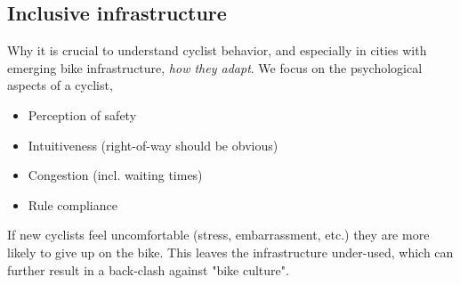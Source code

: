 \color{red}
\subsection{Inclusive infrastructure}
Why it is crucial to understand cyclist behavior, and especially in cities with emerging bike infrastructure, \textit{how they adapt}.
We focus on the psychological aspects of a cyclist,

\begin{itemize}
	\item Perception of safety
	\item Intuitiveness (right-of-way should be obvious)
	\item Congestion (incl. waiting times)
	\item Rule compliance
\end{itemize}

If new cyclists feel uncomfortable (stress, embarrassment, etc.) they are more likely to give up on the bike. This leaves the infrastructure 
under-used, which can further result in a back-clash against "bike culture".
